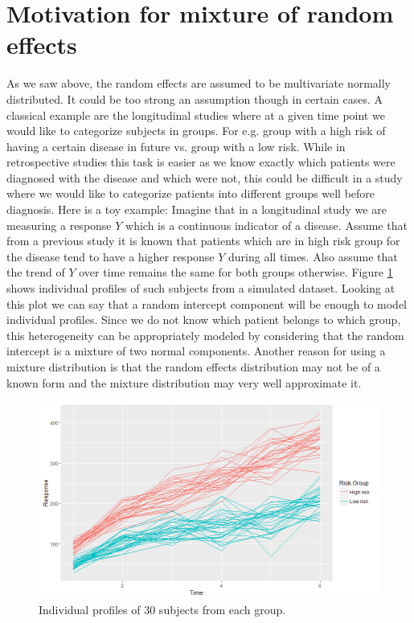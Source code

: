 \section{Motivation for mixture of random effects}
As we saw above, the random effects are assumed to be multivariate normally distributed. It could be too strong an assumption though in certain cases. A classical example are the longitudinal studies where at a given time point we would like to categorize subjects in groups. For e.g. group with a high risk of having a certain disease in future vs. group with a low risk. While in retrospective studies this task is easier as we know exactly which patients were diagnosed with the disease and which were not, this could be difficult in a study where we would like to categorize patients into different groups well before diagnosis. Here is a toy example: Imagine that in a longitudinal study we are measuring a response $Y$ which is a continuous indicator of a disease. Assume that from a previous study it is known that patients which are in high risk group for the disease tend to have a higher response $Y$ during all times. Also assume that the trend of $Y$ over time remains the same for both groups otherwise. Figure \ref{fig : random_slope_dummy_data} shows individual profiles of such subjects from a simulated dataset. Looking at this plot we can say that a random intercept component will be enough to model individual profiles. Since we do not know which patient belongs to which group, this heterogeneity can be appropriately modeled by considering that the random intercept is a mixture of two normal components. Another reason for using a mixture distribution is that the random effects distribution may not be of a known form and the mixture distribution may very well approximate it.\\

\begin{figure}
	\centering
	\captionsetup{justification=centering}
	\includegraphics[scale=0.5]{mainmatter/chapter_3_blmm/random_slope_dummy_data.png}
	\caption{Individual profiles of 30 subjects from each group.}
	\label{fig : random_slope_dummy_data}
\end{figure}

